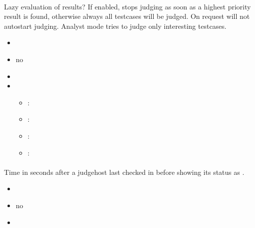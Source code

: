 \documentclass[a4paper,10pt,english,openany]{sphinxmanual}
\begin{document}
\paragraph{}
\label{\detokenize{configuration-reference:lazy-eval-results}}
\sphinxAtStartPar
Lazy evaluation of results? If enabled, stops judging as soon as a highest priority result is found, otherwise always all testcases will be judged. On request will not auto\sphinxhyphen{}start judging. Analyst mode tries to judge only interesting testcases.
\begin{itemize}
\item {} 
\sphinxAtStartPar
{} 

\item {} 
\sphinxAtStartPar
{} no

\item {} 
\sphinxAtStartPar
{} 

\item {} 
\sphinxAtStartPar
{}
\begin{itemize}
\item {} 
\sphinxAtStartPar
{}: 

\item {} 
\sphinxAtStartPar
{}: 

\item {} 
\sphinxAtStartPar
{}: 

\item {} 
\sphinxAtStartPar
{}: 

\end{itemize}

\end{itemize}


\paragraph{}
\label{\detokenize{configuration-reference:judgehost-warning}}
\sphinxAtStartPar
Time in seconds after a judgehost last checked in before showing its status as .
\begin{itemize}
\item {} 
\sphinxAtStartPar
{} 

\item {} 
\sphinxAtStartPar
{} no

\item {} 
\sphinxAtStartPar
{} 

\end{itemize}
\end{document}
